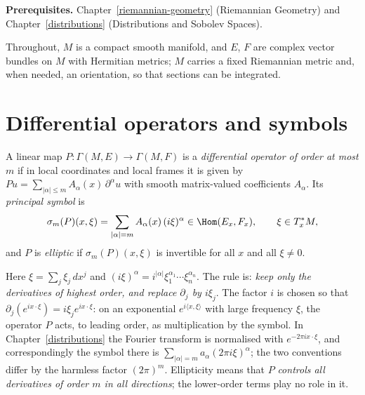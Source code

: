 \noindent\textbf{Prerequisites.} Chapter~\ref{riemannian-geometry} (Riemannian Geometry) and Chapter~\ref{distributions}
(Distributions and Sobolev Spaces).

Throughout, $M$ is a compact smooth manifold, and $E$, $F$ are complex vector bundles on $M$ with Hermitian metrics; $M$ carries a
fixed Riemannian metric and, when needed, an orientation, so that sections can be integrated.

\section{Differential operators and symbols}\label{elliptic-operators:section-symbols}

\begin{definition}\label{elliptic-operators:definition-differential-operator}
A linear map $P \colon \Gamma(M, E) \to \Gamma(M, F)$ is a \emph{differential operator of order at most $m$} if in local coordinates and local frames it is given by
$Pu = \sum_{|\alpha| \leq m}A_\alpha(x)\,\partial^\alpha u$ with smooth matrix-valued coefficients $A_\alpha$. Its \emph{principal symbol} is
\[
\sigma_m(P)(x, \xi) = \sum_{|\alpha| = m}A_\alpha(x)\,(i\xi)^\alpha \in \Hom(E_x, F_x), \qquad \xi \in T^*_xM,
\]
and $P$ is \emph{elliptic} if $\sigma_m(P)(x, \xi)$ is invertible for all $x$ and all $\xi \neq 0$.
\end{definition}

Here $\xi = \sum_j\xi_j\,dx^j$ and $(i\xi)^\alpha = i^{|\alpha|}\xi_1^{\alpha_1} \cdots \xi_n^{\alpha_n}$. The rule is: \emph{keep only the derivatives of highest order, and replace $\partial_j$ by $i\xi_j$}. The
factor $i$ is chosen so that $\partial_j(e^{ix\cdot\xi}) = i\xi_je^{ix\cdot\xi}$: on an exponential $e^{i\langle x, \xi\rangle}$ with large frequency $\xi$, the operator $P$ acts, to leading order, as multiplication by
the symbol. In Chapter~\ref{distributions} the Fourier transform is normalised with $e^{-2\pi ix\cdot\xi}$, and correspondingly the symbol there is $\sum_{|\alpha| = m}a_\alpha(2\pi i\xi)^\alpha$; the two
conventions differ by the harmless factor $(2\pi)^m$. Ellipticity means that $P$ \emph{controls all derivatives of order $m$ in all directions}; the lower-order terms play no role in it.

